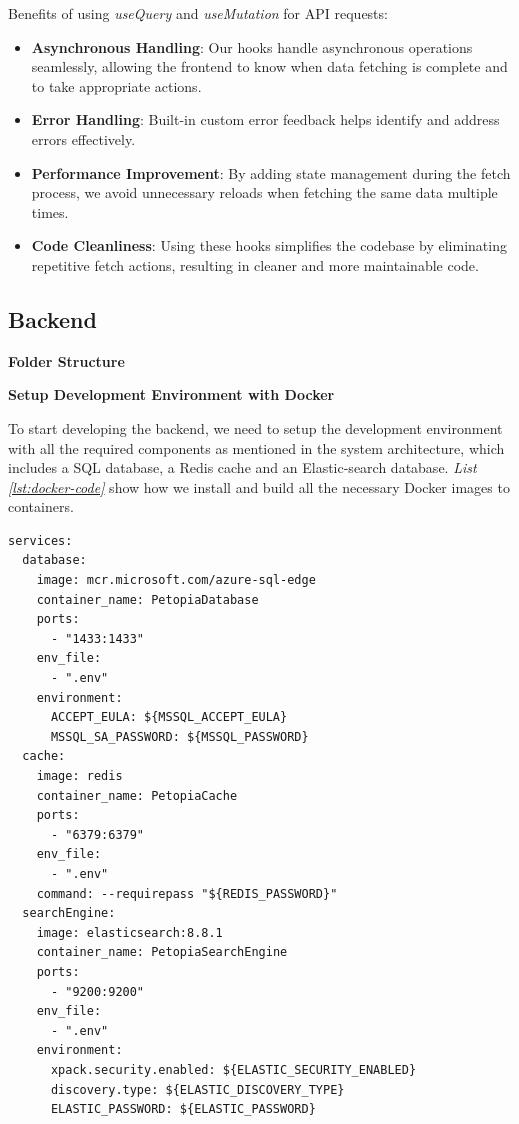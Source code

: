 Benefits of using \textit{useQuery} and \textit{useMutation} for API requests:

\begin{itemize}
    \item \textbf{Asynchronous Handling}: Our hooks handle asynchronous operations seamlessly, allowing the frontend to know when data fetching is complete and to take appropriate actions.
    \item \textbf{Error Handling}: Built-in custom error feedback helps identify and address errors effectively.
    \item \textbf{Performance Improvement}: By adding state management during the fetch process, we avoid unnecessary reloads when fetching the same data multiple times.
    \item \textbf{Code Cleanliness}: Using these hooks simplifies the codebase by eliminating repetitive fetch actions, resulting in cleaner and more maintainable code.
\end{itemize}

\subsection{Backend}


\textbf{Folder Structure}

\textbf{Setup Development Environment with Docker}

To start developing the backend, we need to setup the development environment with
all the required components as mentioned in the system architecture, which includes a SQL database, a Redis cache and an Elastic-search database.
\textit{List \ref{lst:docker-code}} show how we install and build all the necessary Docker images to containers.

\begin{lstlisting}[caption=Setup Development Environment with Docker, label={lst:docker-code}]
services:
  database:
    image: mcr.microsoft.com/azure-sql-edge
    container_name: PetopiaDatabase
    ports:
      - "1433:1433"
    env_file:
      - ".env"
    environment:
      ACCEPT_EULA: ${MSSQL_ACCEPT_EULA}
      MSSQL_SA_PASSWORD: ${MSSQL_PASSWORD}
  cache:
    image: redis
    container_name: PetopiaCache
    ports:
      - "6379:6379"
    env_file:
      - ".env"
    command: --requirepass "${REDIS_PASSWORD}"
  searchEngine:
    image: elasticsearch:8.8.1
    container_name: PetopiaSearchEngine
    ports:
      - "9200:9200"
    env_file:
      - ".env"
    environment:
      xpack.security.enabled: ${ELASTIC_SECURITY_ENABLED}
      discovery.type: ${ELASTIC_DISCOVERY_TYPE}
      ELASTIC_PASSWORD: ${ELASTIC_PASSWORD}
\end{lstlisting}

